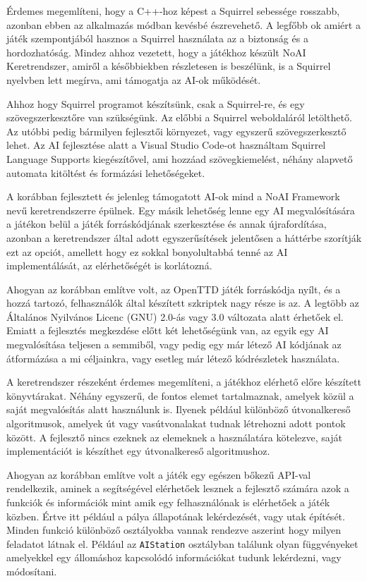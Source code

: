 Érdemes megemlíteni, hogy a C++-hoz képest a Squirrel sebessége rosszabb, azonban ebben az alkalmazás módban kevésbé észrevehető. A legfőbb ok amiért a játék szempontjából hasznos a Squirrel használata az a biztonság és a hordozhatóság. Mindez ahhoz vezetett, hogy a játékhoz készült NoAI Keretrendszer, amiről a későbbiekben részletesen is beszélünk, is a Squirrel nyelvben lett megírva, ami támogatja az AI-ok működését.

Ahhoz hogy Squirrel programot készítsünk, csak a Squirrel-re, és egy szövegszerkesztőre van szükségünk. Az előbbi a Squirrel weboldaláról letölthető. Az utóbbi pedig bármilyen fejlesztői környezet, vagy egyszerű szövegszerkesztő lehet. Az AI fejlesztése alatt a Visual Studio Code-ot használtam Squirrel Language Supports kiegészítővel, ami hozzáad szövegkiemelést, néhány alapvető automata kitöltést és formázási lehetőségeket.



A korábban fejlesztett és jelenleg támogatott AI-ok mind a NoAI Framework nevű keretrendszerre épülnek. Egy másik lehetőség lenne egy AI megvalósítására a játékon belül a játék forráskódjának szerkesztése és annak újrafordítása, azonban a keretrendszer által adott egyszerűsítések jelentősen a háttérbe szorítják ezt az opciót, amellett hogy ez sokkal bonyolultabbá tenné az AI implementálását, az elérhetőségét is korlátozná.

Ahogyan az korábban említve volt, az OpenTTD játék forráskódja nyílt, és a hozzá tartozó, felhasználók által készített szkriptek nagy része is az. A legtöbb az Általános Nyilvános Licenc (GNU) 2.0-ás vagy 3.0 változata alatt érhetőek el. Emiatt a fejlesztés megkezdése előtt két lehetőségünk van, az egyik egy AI megvalósítása teljesen a semmiből, vagy pedig egy már létező AI kódjának az átformázása a mi céljainkra, vagy esetleg már létező kódrészletek használata.

A keretrendszer részeként érdemes megemlíteni, a játékhoz elérhető előre készített könyvtárakat. Néhány egyszerű, de fontos elemet tartalmaznak, amelyek közül a saját megvalósítás alatt használunk is. Ilyenek például különböző útvonalkereső algoritmusok, amelyek út vagy vasútvonalakat tudnak létrehozni adott pontok között. A fejlesztő nincs ezeknek az elemeknek a használatára kötelezve, saját implementációt is készíthet egy útvonalkereső algoritmushoz.



Ahogyan az korábban említve volt a játék egy egészen bőkezű API-val rendelkezik, aminek a segítségével elérhetőek lesznek a fejlesztő számára azok a funkciók és információk mint amik egy felhasználónak is elérhetőek a játék közben. Értve itt például a pálya állapotának lekérdezését, vagy utak építését. Minden funkció különböző osztályokba vannak rendezve aszerint hogy milyen feladatot látnak el. Például az \texttt{AIStation} osztályban találunk olyan függvényeket amelyekkel egy állomáshoz kapcsolódó információkat tudunk lekérdezni, vagy módosítani.

